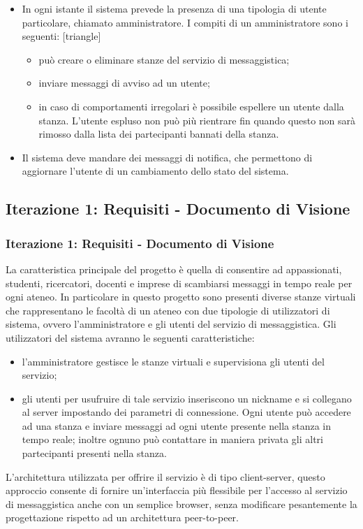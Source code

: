 \begin{frame}[allowframebreaks]
\begin{itemize}
    \item In ogni istante il sistema prevede la presenza di una tipologia di utente particolare, chiamato amministratore. 
    \newline
    I compiti di un amministratore sono i seguenti: 
          [triangle]
          \begin{itemize} 
            \item può creare o eliminare stanze del servizio di messaggistica; 
            \item inviare messaggi di avviso ad un utente;
            \item in caso di comportamenti irregolari è possibile espellere un utente dalla stanza. L'utente espluso non può più rientrare fin quando questo non sarà
                  rimosso dalla lista dei partecipanti bannati della stanza.
          \end{itemize}
    \item Il sistema deve mandare dei messaggi di notifica, che permettono di aggiornare l’utente di un cambiamento dello stato del sistema.
  \end{itemize}
\end{frame}

\subsection{Iterazione 1: Requisiti - Documento di Visione}
\begin{frame} [allowframebreaks]
  \frametitle{Iterazione 1: Requisiti - Documento di Visione}
   La caratteristica principale del progetto è quella di consentire ad appassionati, studenti, ricercatori, docenti e imprese di scambiarsi messaggi in tempo reale   
   per ogni ateneo.  In particolare in questo progetto sono presenti diverse stanze virtuali che rappresentano le facoltà di un ateneo con due tipologie di    
   utilizzatori di sistema, ovvero l’amministratore e gli utenti del servizio di messaggistica. Gli utilizzatori del sistema avranno le seguenti  caratteristiche:
   \begin{itemize} 
    \item l’amministratore gestisce le stanze virtuali e supervisiona gli utenti del servizio;
    \item gli utenti per usufruire di tale servizio inseriscono un nickname e si collegano al server impostando dei parametri di connessione. Ogni utente può    
          accedere ad una stanza e inviare messaggi ad ogni utente presente nella stanza in tempo reale; inoltre ognuno può contattare in maniera privata gli altri 
          partecipanti presenti nella stanza.
   \end{itemize}
   L’architettura utilizzata per offrire il servizio è di tipo client-server, questo approccio consente di fornire un’interfaccia  più flessibile per l’accesso al   
   servizio di messaggistica anche con un semplice browser, senza modificare pesantemente la progettazione rispetto ad un architettura peer-to-peer. 
\end{frame}

